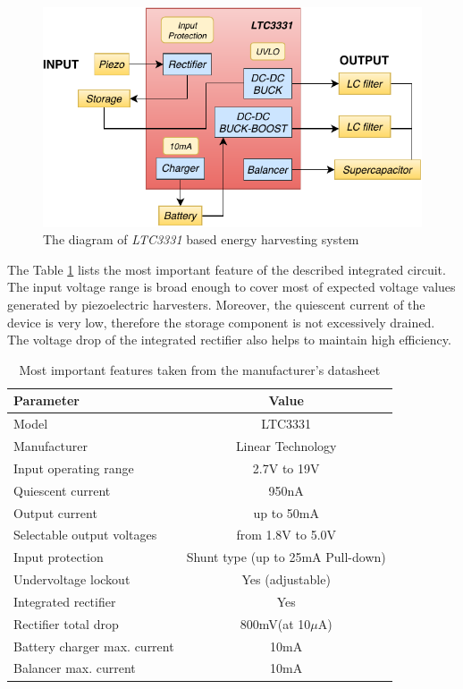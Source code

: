 \documentclass[12pt,a4paper]{article}
\begin{document}
\begin{figure}[ht!]
\includegraphics[scale=1.2]{LTC3331.pdf}
\caption{The diagram of \textit{LTC3331} based energy harvesting system}
\label{fig:ltc3331diagram}
\end{figure}
\par
The Table \ref{tab:ltc3331_params} lists the most important feature of the described integrated circuit. The input voltage range is broad enough to cover most of expected voltage values generated by piezoelectric harvesters. Moreover, the quiescent current of the device is very low, therefore the storage component is not excessively drained. The voltage drop of the integrated rectifier also helps to maintain high efficiency. 
\begin{table}[ht!]
\begin{tabular}{|l|c|}
\hline
\textbf{Parameter}	& \textbf{Value} 	\\ \hline
Model  				& LTC3331       \\ \hline
Manufacturer    	& Linear Technology	\\ \hline
Input operating range      &  2.7V to 19V 		\\ \hline
Quiescent current     &  950nA			\\ \hline
Output current        &  up to 50mA			\\ \hline
Selectable output voltages & from 1.8V to 5.0V \\ \hline
Input protection &  Shunt type (up to 25mA Pull-down)\\ \hline
Undervoltage lockout 	&  Yes (adjustable)		\\ \hline
Integrated rectifier 	&  Yes 		\\ \hline
Rectifier total drop 	&  800mV(at 10$\mu$A) 		\\ \hline
Battery charger max. current 	&  10mA 		\\ \hline
Balancer max. current 	&  10mA 		\\ \hline
\end{tabular}
\caption{Most important features taken from the manufacturer's datasheet \cite{ltc3331_params}}
\label{tab:ltc3331_params}
\end{table}
\par
\end{document}
